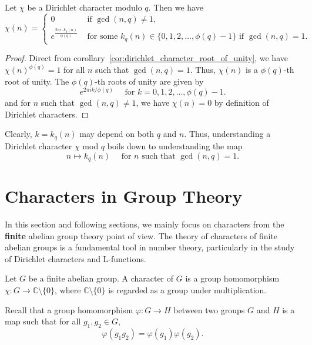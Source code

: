 \documentclass{elegantbook}
\begin{document}
\begin{corollary} \label{cor:dirichlet_character_are_roots_of_unity}
  Let $\chi$ be a Dirichlet character modulo $q$. Then we have
  \[
    \chi(n) = \begin{cases}
      0 & \text{ if } \gcd(n,q) \ne 1, \\
      e^{\frac{2\pi i \cdot k_q(n)}{\phi(q)}} & \text{ for some } k_q(n) \in \{0,1,2,\ldots,\phi(q)-1\} \text{ if } \gcd(n,q) = 1.
    \end{cases}
  \]
\end{corollary}

\begin{proof}
  Direct from corollary~\ref{cor:dirichlet_character_root_of_unity}, we have $\chi(n)^{\phi(q)} = 1$ for all $n$ such that $\gcd(n,q) = 1$. Thus, $\chi(n)$ is a $\phi(q)$-th root of unity. The $\phi(q)$-th roots of unity are given by
  \[
    e^{2\pi i k / \phi(q)} \quad \text{ for } k = 0, 1, 2, \ldots, \phi(q)-1.
  \]
  and for $n$ such that $\gcd(n,q) \ne 1$, we have $\chi(n) = 0$ by definition of Dirichlet characters.
\end{proof}

\begin{remark}
  Clearly, $k=k_q(n)$ may depend on both $q$ and $n$. Thus, understanding a Dirichlet character $\chi$ mod $q$ boils down to understanding the map
  \[
    n \mapsto k_q(n) \quad \text{ for } n \text{ such that } \gcd(n,q) = 1.
  \]
\end{remark}


\section{Characters in Group Theory}

In this section and following sections, we mainly focus on characters from the \textbf{finite} abelian group theory point of view. The theory of characters of finite abelian groups is a fundamental tool in number theory, particularly in the study of Dirichlet characters and L-functions.

\begin{definition}
  Let $G$ be a finite abelian group. A character of $G$ is a group homomorphism $\chi:G\to \mathbb{C}\setminus\{0\}$, where $\mathbb{C}\setminus\{0\}$ is regarded as a group under multiplication.
\end{definition}

\begin{note}
  Recall that a group homomorphism $\varphi:G\to H$ between two groups $G$ and $H$ is a map such that for all $g_1,g_2\in G$,
  \[
    \varphi(g_1 g_2) = \varphi(g_1) \varphi(g_2).
  \]
\end{note}
\end{document}
